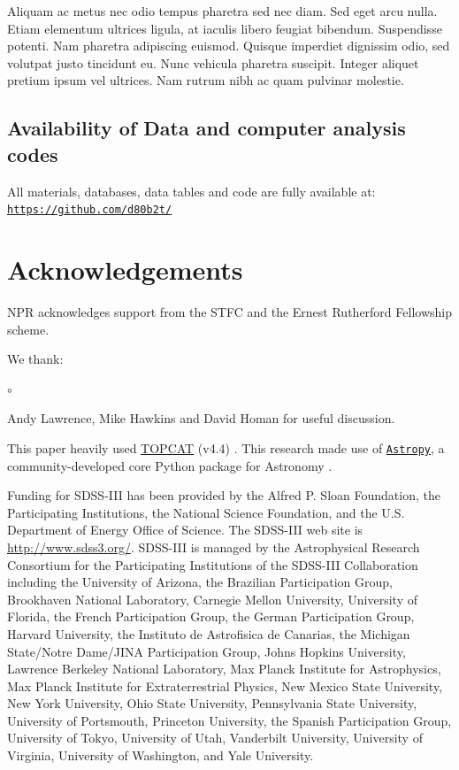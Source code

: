 \documentclass[a4paper,fleqn,usenatbib]{mnras}
\begin{document}
Aliquam ac metus nec odio tempus pharetra sed nec diam. Sed eget arcu
nulla. Etiam elementum ultrices ligula, at iaculis libero feugiat
bibendum. Suspendisse potenti. Nam pharetra adipiscing
euismod. Quisque imperdiet dignissim odio, sed volutpat justo
tincidunt eu. Nunc vehicula pharetra suscipit. Integer aliquet pretium
ipsum vel ultrices. Nam rutrum nibh ac quam pulvinar molestie.



\subsection*{Availability of Data and computer analysis codes} 
All materials, databases, data tables and code are fully available at: 
\href{https://github.com/d80b2t/VHzQ}{\tt https://github.com/d80b2t/}


\section*{Acknowledgements}
NPR acknowledges support from the STFC and the Ernest Rutherford Fellowship scheme. 

\noindent
We thank:
\begin{list}{$\circ$}{}  
  \item Andy Lawrence, Mike Hawkins and David Homan for useful discussion. 
\end{list}

This paper heavily used \href{http://www.star.bris.ac.uk/~mbt/topcat/}{TOPCAT} (v4.4)
\citep[][]{Taylor2005, Taylor2011}.
This research made use of \href{http://www.astropy.org}{\tt Astropy}, 
a community-developed core Python package for Astronomy 
\citep{AstropyCollaboration2013, AstropyCollaboration2018}.

Funding for SDSS-III has been provided by the Alfred P. Sloan
Foundation, the Participating Institutions, the National Science
Foundation, and the U.S. Department of Energy Office of Science. The
SDSS-III web site is
\href{http://www.sdss3.org/}{http://www.sdss3.org/}.
SDSS-III is managed by the Astrophysical Research Consortium for the
Participating Institutions of the SDSS-III Collaboration including the
University of Arizona, the Brazilian Participation Group, Brookhaven
National Laboratory, Carnegie Mellon University, University of
Florida, the French Participation Group, the German Participation
Group, Harvard University, the Instituto de Astrofisica de Canarias,
the Michigan State/Notre Dame/JINA Participation Group, Johns Hopkins
University, Lawrence Berkeley National Laboratory, Max Planck
Institute for Astrophysics, Max Planck Institute for Extraterrestrial
Physics, New Mexico State University, New York University, Ohio State
University, Pennsylvania State University, University of Portsmouth,
Princeton University, the Spanish Participation Group, University of
Tokyo, University of Utah, Vanderbilt University, University of
Virginia, University of Washington, and Yale University.
\end{document}
